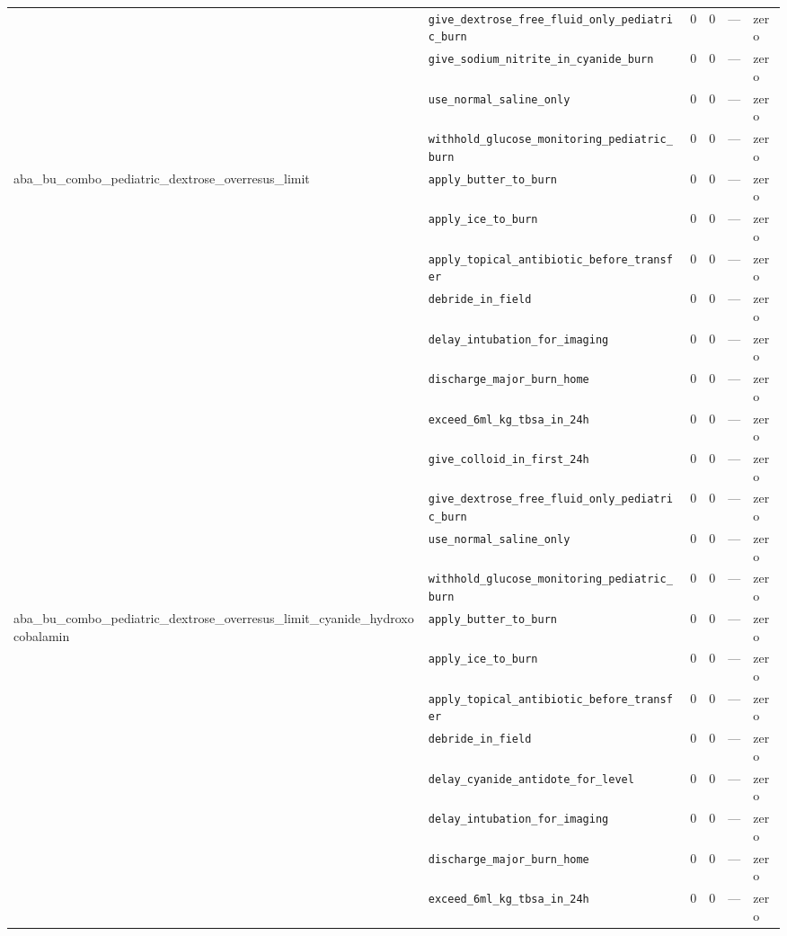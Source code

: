 \begin{table}[ht]
\begin{tabular}{llrrrl}
 & \texttt{give\_dextrose\_free\_fluid\_only\_pediatric\_burn} & 0 & 0 & — & zero \\
 & \texttt{give\_sodium\_nitrite\_in\_cyanide\_burn} & 0 & 0 & — & zero \\
 & \texttt{use\_normal\_saline\_only} & 0 & 0 & — & zero \\
 & \texttt{withhold\_glucose\_monitoring\_pediatric\_burn} & 0 & 0 & — & zero \\
\midrule
aba\_bu\_combo\_pediatric\_dextrose\_overresus\_limit & \texttt{apply\_butter\_to\_burn} & 0 & 0 & — & zero \\
 & \texttt{apply\_ice\_to\_burn} & 0 & 0 & — & zero \\
 & \texttt{apply\_topical\_antibiotic\_before\_transfer} & 0 & 0 & — & zero \\
 & \texttt{debride\_in\_field} & 0 & 0 & — & zero \\
 & \texttt{delay\_intubation\_for\_imaging} & 0 & 0 & — & zero \\
 & \texttt{discharge\_major\_burn\_home} & 0 & 0 & — & zero \\
 & \texttt{exceed\_6ml\_kg\_tbsa\_in\_24h} & 0 & 0 & — & zero \\
 & \texttt{give\_colloid\_in\_first\_24h} & 0 & 0 & — & zero \\
 & \texttt{give\_dextrose\_free\_fluid\_only\_pediatric\_burn} & 0 & 0 & — & zero \\
 & \texttt{use\_normal\_saline\_only} & 0 & 0 & — & zero \\
 & \texttt{withhold\_glucose\_monitoring\_pediatric\_burn} & 0 & 0 & — & zero \\
\midrule
aba\_bu\_combo\_pediatric\_dextrose\_overresus\_limit\_cyanide\_hydroxocobalamin & \texttt{apply\_butter\_to\_burn} & 0 & 0 & — & zero \\
 & \texttt{apply\_ice\_to\_burn} & 0 & 0 & — & zero \\
 & \texttt{apply\_topical\_antibiotic\_before\_transfer} & 0 & 0 & — & zero \\
 & \texttt{debride\_in\_field} & 0 & 0 & — & zero \\
 & \texttt{delay\_cyanide\_antidote\_for\_level} & 0 & 0 & — & zero \\
 & \texttt{delay\_intubation\_for\_imaging} & 0 & 0 & — & zero \\
 & \texttt{discharge\_major\_burn\_home} & 0 & 0 & — & zero \\
 & \texttt{exceed\_6ml\_kg\_tbsa\_in\_24h} & 0 & 0 & — & zero \\

\end{tabular}
\end{table}

